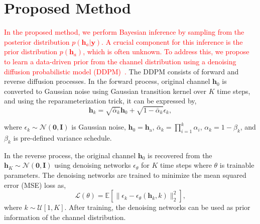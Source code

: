 \documentclass[lettersize,journal]{IEEEtran}
\newcommand{\tred}{\textcolor{red}}
\begin{document}
\section{Proposed Method}

\tred{In the proposed method, we perform Bayesian inference by sampling from the posterior distribution $p(\mathbf{h}_{a}|\mathbf{y})$. A crucial component for this inference is the prior distribution $p(\mathbf{h}_{a})$, which is often unknown. To address this, we propose to learn a data-driven prior from the channel distribution using a denoising diffusion probabilistic model (DDPM)~\cite{hoDenoisingDiffusionProbabilistic2020}.} The DDPM consists of forward and reverse diffusion processes. In the forward process, original channel $\mathbf{h}_{0}$ is converted to Gaussian noise using Gaussian transition kernel over $K$ time steps, and using the reparameterization trick, it can be expressed by,
\begin{equation}
\mathbf{h}_{k} = \sqrt{ \bar{\alpha}_{k} }\mathbf{h}_{0} + \sqrt{ 1-\bar{\alpha}_{k} }\epsilon_{k},
\end{equation}

where $\epsilon_{k}\sim\mathcal{N}(\mathbf{0},\mathbf{I})$ is Gaussian noise, $\mathbf{h}_{0} = \mathbf{h}_{\text{a}}$, $\bar{\alpha}_{k}=\prod_{i=1}^{k}\alpha_{i}$, $\alpha_{k}=1-\beta_{k}$, and $\beta_{k}$ is pre-defined variance schedule.

In the reverse process, the original channel $\mathbf{h}_{0}$ is recovered from the $\mathbf{h}_{K}\sim\mathcal{N}(\mathbf{0},\mathbf{I})$ using denoising networks $\epsilon_{\theta}$ for $K$ time steps where $\theta$ is trainable parameters. The denoising networks are trained to minimize the mean squared error (MSE) loss as,
\begin{equation}
\mathcal{L}(\theta) = \mathbb{E}[\|\epsilon_{k} - \epsilon_{\theta}(\mathbf{h}_{k},k)\|_{2}^{2}],
\end{equation}
where $k\sim\mathcal{U}[1,K]$. After training, the denoising networks can be used as prior information of the channel distribution.
\end{document}
